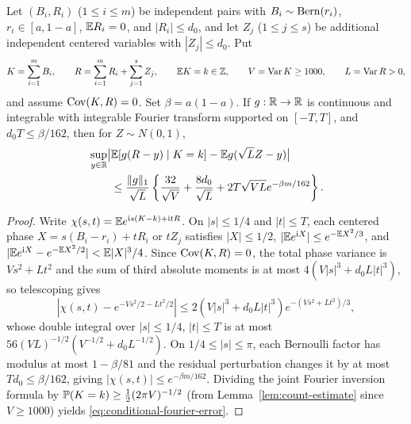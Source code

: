 \begin{lemma}\label{lem:conditional-fourier}
Let $(B_i,R_i)$ ($1\le i\le m$) be independent pairs with $B_i\sim\operatorname{Bern}(r_i)$,
$r_i\in[a,1-a]$, $\mathbb E R_i=0$, and $|R_i|\le d_0$, and let $Z_j$ ($1\le j\le s$)
be additional independent centered variables with $|Z_j|\le d_0$. Put
\[
 K=\sum_{i=1}^m B_i,\qquad R=\sum_{i=1}^mR_i+\sum_{j=1}^sZ_j,\qquad
 \mathbb E K=k\in\mathbb Z,\qquad V=\operatorname{Var} K\ge1000,\qquad L=\operatorname{Var} R>0,
\]
and assume $\operatorname{Cov}(K,R)=0$. Set $\beta=a(1-a)$. If $g:\mathbb R\to\mathbb R$ is continuous
and integrable with integrable Fourier transform supported on $[-T,T]$, and
$d_0T\le\beta/162$, then for $Z\sim N(0,1)$,
\begin{align}
 &\sup_{y\in\mathbb R}\bigl|\mathbb E[g(R-y)\mid K=k]-\mathbb E g(\sqrt L Z-y)\bigr|\notag\\
 &\qquad\le\frac{\|g\|_1}{\sqrt L}
 \left\{\frac{32}{\sqrt V}+\frac{8d_0}{\sqrt L}
                 +2T\sqrt{VL}e^{-\beta m/162}\right\}.    \label{eq:conditional-fourier-error}
\end{align}
\end{lemma}
\begin{proof}
Write $\chi(s,t)=\mathbb E e^{\mathrm i s(K-k)+\mathrm i tR}$. On $|s|\le1/4$ and $|t|\le T$,
each centered phase $X=s(B_i-r_i)+tR_i$ or $tZ_j$ satisfies $|X|\le1/2$,
$|\mathbb E e^{\mathrm i X}|\le e^{-\mathbb E X^2/3}$, and $|\mathbb E e^{\mathrm i X}-e^{-\mathbb E X^2/2}|<\mathbb E|X|^3/4$.
Since $\operatorname{Cov}(K,R)=0$, the total phase variance is $Vs^2+Lt^2$ and the sum of
third absolute moments is at most $4(V|s|^3+d_0L|t|^3)$, so telescoping
gives
\[
 |\chi(s,t)-e^{-Vs^2/2-Lt^2/2}|
 \le2(V|s|^3+d_0L|t|^3)e^{-(Vs^2+Lt^2)/3},
\]
whose double integral over $|s|\le1/4$, $|t|\le T$ is at most
$56(VL)^{-1/2}(V^{-1/2}+d_0L^{-1/2})$. On $1/4\le|s|\le\pi$, each Bernoulli
factor has modulus at most $1-\beta/81$ and the residual perturbation changes
it by at most $Td_0\le\beta/162$, giving $|\chi(s,t)|\le e^{-\beta m/162}$.
Dividing the joint Fourier inversion formula by $\mathbb P(K=k)\ge\frac12(2\pi V)^{-1/2}$
(from Lemma~\ref{lem:count-estimate} since $V\ge1000$) yields
\eqref{eq:conditional-fourier-error}.
\end{proof}

